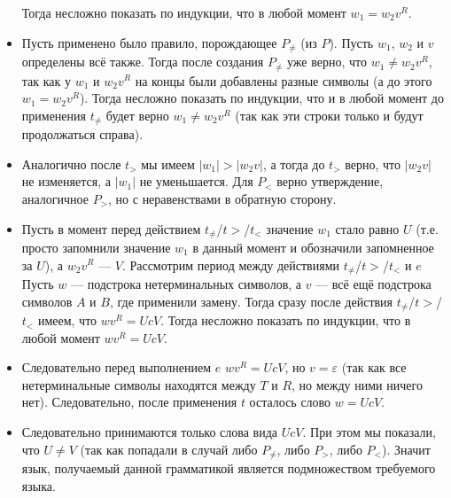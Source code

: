 \documentclass[12pt,a4paper]{article}
\begin{document}
\begin{problem}{5}
\begin{itemize}
                Тогда несложно показать по индукции, что в любой момент $w_1 = w_2 v^R$.
            \item Пусть применено было правило, порождающее $P_{\neq}$ (из $P$). Пусть $w_1$, $w_2$ и $v$ определены всё также. Тогда после создания $P_{\neq}$ уже верно, что $w_1 \neq w_2 v^R$, так как у $w_1$ и $w_2 v^R$ на концы были добавлены разные символы (а до этого $w_1 = w_2 v^R$). Тогда несложно показать по индукции, что и в любой момент до применения $t_{\neq}$ будет верно $w_1 \neq w_2 v^R$ (так как эти строки только и будут продолжаться справа).
            \item Аналогично после $t_>$ мы имеем $|w_1| > |w_2 v|$, а тогда до $t_>$ верно, что $|w_2 v|$ не изменяется, а $|w_1|$ не уменьшается. Для $P_<$ верно утверждение, аналогичное $P_>$, но с неравенствами в обратную сторону. 
            \item Пусть в момент перед действием $t_{\neq}$/$t>$/$t_<$ значение $w_1$ стало равно $U$ (т.е. просто запомнили значение $w_1$ в данный момент и обозначили запомненное за $U$), а $w_2 v^R$ --- $V$. Рассмотрим период между действиями $t_{\neq}$/$t>$/$t_<$ и $e$ Пусть $w$ --- подстрока нетерминальных символов, а $v$ --- всё ещё подстрока символов $A$ и $B$, где применили замену. Тогда сразу после действия $t_{\neq}$/$t>$/$t_<$ имеем, что $w v^R = UcV$. Тогда несложно показать по индукции, что в любой момент $w v^R = UcV$.
            \item Следовательно перед выполнением $e$ $wv^R = UcV$, но $v = \varepsilon$ (так как все нетерминальные символы находятся между $T$ и $R$, но между ними ничего нет). Следовательно, после применения $t$ осталось слово $w = UcV$.
            \item Следовательно принимаются только слова вида $UcV$. При этом мы показали, что $U \neq V$ (так как попадали в случай либо $P_{\neq}$, либо $P_>$, либо $P_<$). Значит язык, получаемый данной грамматикой является подмножеством требуемого языка.
        \end{itemize}


\end{problem}
\end{document}
